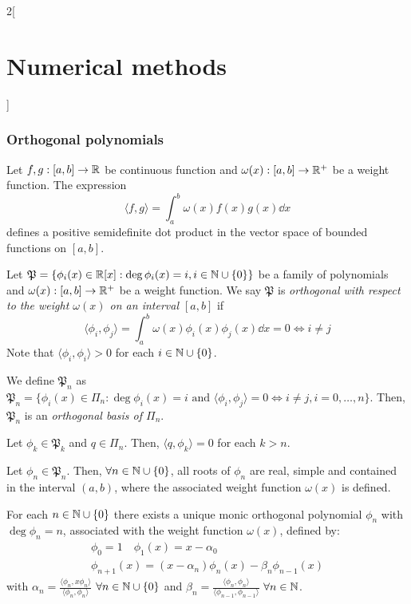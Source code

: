 \documentclass[../../../main.tex]{subfiles}
\begin{document}
\begin{multicols}{2}[\section{Numerical methods}]
\subsubsection*{Orthogonal polynomials}
\begin{definition}
    Let $f,g:[a,b]\rightarrow\mathbb{R}$ be continuous function and $\omega(x):[a,b]\rightarrow\mathbb{R}^+$ be a weight function. The expression $$\langle f,g\rangle=\int_a^b\omega(x)f(x)g(x)\dd x$$ defines a positive semidefinite dot product in the vector space of bounded functions on $[a,b]$.
\end{definition}
\begin{definition}
    Let $\mathfrak{P}=\{\phi_i(x)\in\mathbb{R}[x]:\deg \phi_i(x)=i, i\in\mathbb{N}\cup\{0\}\}$ be a family of polynomials and $\omega(x):[a,b]\rightarrow\mathbb{R}^+$ be a weight function. We say $\mathfrak{P}$ is \textit{orthogonal with respect to the weight $\omega(x)$ on an interval $[a,b]$} if $$\langle \phi_i,\phi_j\rangle=\int_a^b\omega(x)\phi_i(x)\phi_j(x)\dd x=0\iff i\ne j$$
    Note that $\langle \phi_i,\phi_i\rangle>0$ for each $i\in\mathbb{N}\cup\{0\}$.
\end{definition}
\begin{lemma}
    We define $\mathfrak{P}_n$ as $\mathfrak{P}_n=\{\phi_i(x)\in\Pi_n:\deg\phi_i(x)=i\text{ and }\langle \phi_i,\phi_j\rangle=0\iff i\ne j,  i=0,\ldots,n\}$. Then, $\mathfrak{P}_n$ is an \textit{orthogonal basis of $\Pi_n$}. 
\end{lemma}
\begin{lemma}
    Let $\phi_k\in\mathfrak{P}_k$ and $q\in\Pi_n$. Then, $\langle q,\phi_k\rangle=0$ for each $k>n$.
\end{lemma}
\begin{lemma}
    Let $\phi_n\in\mathfrak{P}_n$. Then, $\forall n\in\mathbb{N}\cup\{0\}$, all roots of $\phi_n$ are real, simple and contained in the interval $(a,b)$, where the associated weight function $\omega(x)$ is defined.
\end{lemma}
\begin{theorem}
    For each $n\in\mathbb{N}\cup\{0\}$ there exists a unique monic orthogonal polynomial $\phi_n$ with $\deg\phi_n=n$, associated with the weight function $\omega(x)$, defined by:
    \begin{gather*}
        \phi_0=1\quad\phi_1(x)=x-\alpha_0\\
        \phi_{n+1}(x)=(x-\alpha_n)\phi_n(x)-\beta_n\phi_{n-1}(x)
    \end{gather*}
    with $\alpha_n=\frac{\langle\phi_n,x\phi_n\rangle}{\langle\phi_n,\phi_n\rangle}$ $\forall n\in\mathbb{N}\cup\{0\}$ and $\beta_n=\frac{\langle\phi_n,\phi_n\rangle}{\langle\phi_{n-1},\phi_{n-1}\rangle}$ $\forall n\in\mathbb{N}$.

\end{theorem}
\end{multicols}
\end{document}
